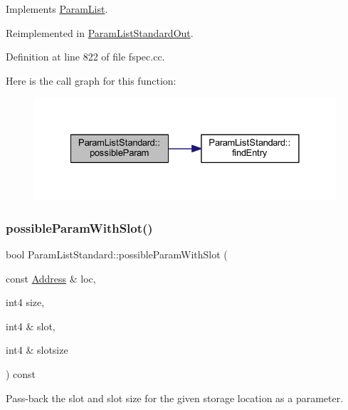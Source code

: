 Implements \mbox{\hyperlink{class_param_list_a77bf29c2bd3fe17be0e8200af97c50d9}{Param\+List}}.



Reimplemented in \mbox{\hyperlink{class_param_list_standard_out_a9c8b1c882536296945ff816d9e3f3600}{Param\+List\+Standard\+Out}}.



Definition at line 822 of file fspec.\+cc.

Here is the call graph for this function\+:
\nopagebreak
\begin{figure}[H]
\begin{center}
\leavevmode
\includegraphics[width=328pt]{class_param_list_standard_a22a2afd938c503357fac9d330eb89858_cgraph}
\end{center}
\end{figure}
\mbox{\label{class_param_list_standard_a9b9ed2f66a0e7401208abcd385f2c678}} 
\subsubsection{\texorpdfstring{possibleParamWithSlot()}{possibleParamWithSlot()}}
{\footnotesize\ttfamily bool Param\+List\+Standard\+::possible\+Param\+With\+Slot (\begin{DoxyParamCaption}\item[{const \mbox{\hyperlink{class_address}{Address}} \&}]{loc,  }\item[{int4}]{size,  }\item[{int4 \&}]{slot,  }\item[{int4 \&}]{slotsize }\end{DoxyParamCaption}) const\hspace{0.3cm}{\ttfamily [virtual]}}



Pass-\/back the slot and slot size for the given storage location as a parameter. 

